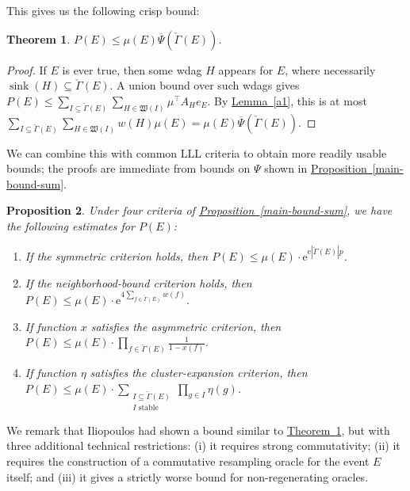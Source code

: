 \documentclass[11pt]{article}
\newcommand{\expref}[2]{\texorpdfstring{\hyperref[#2]{#1~\ref{#2}}}{#1~\ref{#2}}}
\newtheorem{theorem}{Theorem}[section]
\newtheorem{proposition}[theorem]{Proposition}
\newcommand{\eee}{\mathrm e}
\DeclareMathOperator{\sink}{sink}
\begin{document}
This gives us the following crisp bound:
 
\begin{theorem}
\label{crispdist}
$P(E) \leq \mu(E) \overline{\Psi}(\check \Gamma(E))$.
\end{theorem}
\begin{proof}
If $E$ is ever true, then some wdag $H$ appears for $E$, where necessarily $\sink(H) \subseteq \check \Gamma(E)$. A union bound over such wdags gives $P(E) \leq \sum_{I \subseteq \check \Gamma(E)} \sum_{H \in \mathfrak W(I)} \mu^{\top} A_H e_E$. By \expref{Lemma}{a1}, this is at most $\sum_{I \subseteq \check \Gamma(E)} \sum_{H \in \mathfrak W(I)} w(H) \mu(E) = \mu(E) \overline{\Psi} (\check \Gamma(E))$.
\end{proof}

We can combine this with common LLL criteria to obtain more readily usable bounds; the proofs are immediate from bounds on $\Psi$ shown in \expref{Proposition}{main-bound-sum}.
\begin{proposition}
\label{main-bound-sum2}
Under four criteria of \expref{Proposition}{main-bound-sum}, we have the following estimates for $P(E)$:
\begin{enumerate}
\item If the symmetric criterion holds,  then  $P(E) \leq \mu(E) \cdot \eee^{\eee |\check \Gamma(E)|  p}$.

\item If the neighborhood-bound criterion holds, then $P(E) \leq \mu(E) \cdot \eee^{4 \sum_{f \in \check \Gamma(E)} w(f)}$.

\item If function $x$ satisfies the asymmetric criterion, then $P(E) \leq \mu(E) \cdot \prod_{f \in \check \Gamma(E)} \frac{1}{1 - x(f)}$.

\item If function $\eta$ satisfies the cluster-expansion criterion,  then $P(E) \leq \mu(E) \cdot \sum_{\substack{ I \subseteq \check \Gamma(E) \\ \text{$I$ stable}}}  \prod_{g \in I} \eta(g)$.
\end{enumerate}
\end{proposition}

We remark that Iliopoulos \cite{LLLWTL} had shown a bound similar to \expref{Theorem}{crispdist}, but with three additional technical restrictions: (i) it requires strong commutativity; (ii) it requires the construction of a commutative resampling oracle for the event $E$ itself; and (iii)  it gives a strictly worse bound for non-regenerating oracles.
\end{document}
